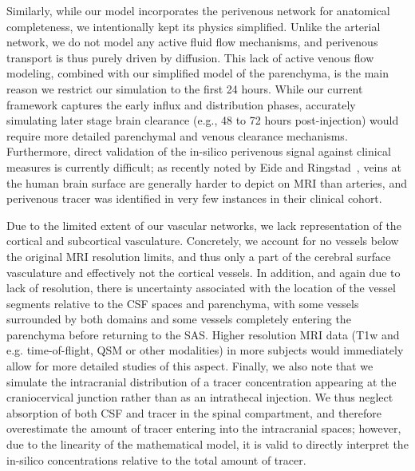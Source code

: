 \documentclass[fleqn,10pt]{wlscirep}
\begin{document}
Similarly, while our model incorporates the perivenous network for anatomical completeness, we intentionally kept its physics simplified. Unlike the arterial network, we do not model any active fluid flow mechanisms, and perivenous transport is thus purely driven by diffusion.
This lack of active venous flow modeling, combined with our simplified model of the parenchyma, is the main reason  we restrict our simulation to the first 24 hours. 
While our current framework captures the early influx and distribution phases, accurately 
simulating later stage brain clearance (e.g., 48 to 72 hours post-injection) 
would require more detailed parenchymal and venous clearance mechanisms. 
Furthermore, direct validation of the in-silico perivenous signal against 
clinical measures is currently difficult; as recently noted by Eide and 
Ringstad~\cite{eide2024functional}, veins at the human brain surface are 
generally harder to depict on MRI than arteries, and perivenous tracer 
was identified in very few instances in their clinical cohort.

Due to the limited extent of our vascular networks, we lack
representation of the cortical and subcortical vasculature. 
Concretely, we account for no vessels below the original
MRI resolution limits, and thus only a part of the cerebral surface
vasculature and effectively not the cortical vessels. In addition, and
again due to lack of resolution, there is uncertainty associated with
the location of the vessel segments relative to the CSF spaces and
parenchyma, with some vessels surrounded by both domains and some
vessels completely entering the parenchyma before returning to the
SAS. Higher resolution MRI data (T1w and e.g. time-of-flight, QSM or
other modalities) in more subjects would immediately allow for more
detailed studies of this aspect. Finally, we also note that we
simulate the intracranial distribution of a tracer concentration
appearing at the craniocervical junction rather than as an intrathecal
injection. We thus neglect absorption of both CSF and tracer in the
spinal compartment, and therefore overestimate the amount of tracer
entering into the intracranial spaces; however, due to the linearity
of the mathematical model, it is valid to directly interpret the
in-silico concentrations relative to the total amount of tracer.
\end{document}
